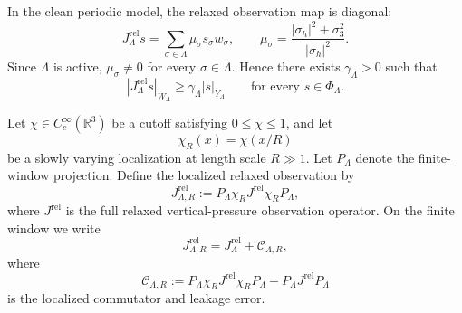 \documentclass[11pt]{article}
\numberwithin{equation}{section}
\begin{document}
In the clean periodic model, the relaxed observation map is diagonal:
\[
        J_\Lambda^{\mathrm{rel}}s
        =\sum_{\sigma\in\Lambda}\mu_\sigma s_\sigma w_\sigma,
        \qquad
        \mu_\sigma=\frac{|\sigma_h|^2+\sigma_3^2}{|\sigma_h|^2}.
\]
Since \(\Lambda\) is active, \(\mu_\sigma\neq0\) for every \(\sigma\in\Lambda\).  Hence there exists \(\gamma_\Lambda>0\) such that
\begin{equation}\label{eq:clean-active-visibility-lower}
        |J_\Lambda^{\mathrm{rel}}s|_{W_\Lambda}
        \ge
        \gamma_\Lambda |s|_{Y_\Lambda}
        \qquad
        \text{for every }s\in\Phi_\Lambda.
\end{equation}

Let \(\chi\in C_c^\infty(\mathbb R^3)\) be a cutoff satisfying \(0\le\chi\le1\), and let
\[
        \chi_R(x)=\chi(x/R)
\]
be a slowly varying localization at length scale \(R\gg1\).  Let \(P_\Lambda\) denote the finite-window projection.  Define the localized relaxed observation by
\begin{equation}\label{eq:localized-Jrel-def}
        J_{\Lambda,R}^{\mathrm{rel}}
        :=P_\Lambda\chi_RJ^{\mathrm{rel}}\chi_RP_\Lambda,
\end{equation}
where \(J^{\mathrm{rel}}\) is the full relaxed vertical-pressure observation operator.  On the finite window we write
\begin{equation}\label{eq:localized-Jrel-comm-decomp}
        J_{\Lambda,R}^{\mathrm{rel}}
        =J_\Lambda^{\mathrm{rel}}+\mathcal C_{\Lambda,R},
\end{equation}
where
\begin{equation}\label{eq:commutator-error-def}
        \mathcal C_{\Lambda,R}
        :=P_\Lambda\chi_RJ^{\mathrm{rel}}\chi_RP_\Lambda
        -P_\Lambda J^{\mathrm{rel}}P_\Lambda
\end{equation}
is the localized commutator and leakage error.
\end{document}
